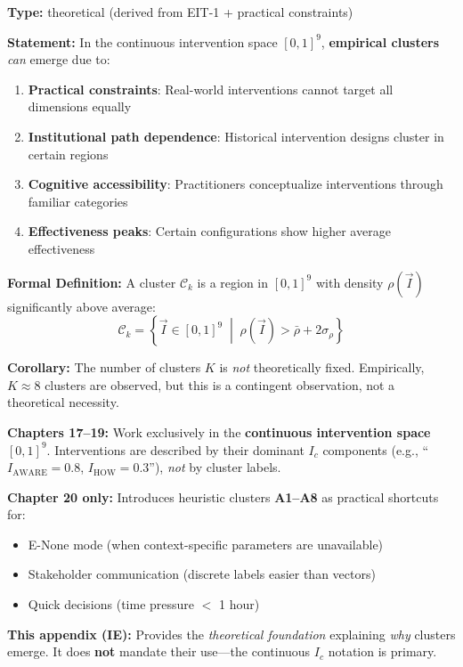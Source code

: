 \begin{tcolorbox}[colback=blue!5!white, colframe=blue!75!black,
    title=\textbf{Axiom EIT-3: Cluster Emergence (Type Formation)}]

\textbf{Type:} theoretical (derived from EIT-1 + practical constraints)

\textbf{Statement:} In the continuous intervention space $[0,1]^9$, \textbf{empirical clusters} \textit{can} emerge due to:
\begin{enumerate}[nosep]
    \item \textbf{Practical constraints}: Real-world interventions cannot target all dimensions equally
    \item \textbf{Institutional path dependence}: Historical intervention designs cluster in certain regions
    \item \textbf{Cognitive accessibility}: Practitioners conceptualize interventions through familiar categories
    \item \textbf{Effectiveness peaks}: Certain configurations show higher average effectiveness
\end{enumerate}

\textbf{Formal Definition:} A cluster $\mathcal{C}_k$ is a region in $[0,1]^9$ with density $\rho(\vec{I})$ significantly above average:
\begin{equation}
\mathcal{C}_k = \left\{ \vec{I} \in [0,1]^9 \;\middle|\; \rho(\vec{I}) > \bar{\rho} + 2\sigma_\rho \right\}
\end{equation}

\textbf{Corollary:} The number of clusters $K$ is \textit{not} theoretically fixed. Empirically, $K \approx 8$ clusters are observed, but this is a contingent observation, not a theoretical necessity.
\end{tcolorbox}

\begin{tcolorbox}[colback=yellow!5!white, colframe=yellow!75!black,
    title=\textbf{Important: Cluster Labels in the EBF Framework}]

\textbf{Chapters 17--19:} Work exclusively in the \textbf{continuous intervention space} $[0,1]^9$. Interventions are described by their dominant $I_c$ components (e.g., ``$I_{\text{AWARE}} = 0.8$, $I_{\text{HOW}} = 0.3$''), \textit{not} by cluster labels.

\textbf{Chapter 20 only:} Introduces heuristic clusters \textbf{A1--A8} as practical shortcuts for:
\begin{itemize}[nosep]
    \item E-None mode (when context-specific parameters are unavailable)
    \item Stakeholder communication (discrete labels easier than vectors)
    \item Quick decisions (time pressure $<$ 1 hour)
\end{itemize}

\textbf{This appendix (IE):} Provides the \textit{theoretical foundation} explaining \textit{why} clusters emerge. It does \textbf{not} mandate their use---the continuous $I_c$ notation is primary.

\end{tcolorbox}


